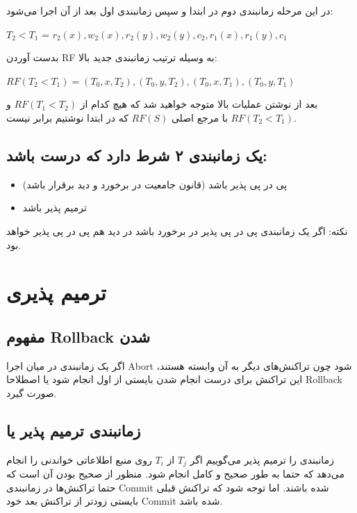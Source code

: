 \documentclass[a4paper]{article}
\begin{document}
در این مرحله زمانبندی دوم در ابتدا و سپس زمانبندی اول بعد از آن اجرا می‌شود:

\begin{LTR}
$T_{2} < T_{1}$ = $r_{2}(x), w_{2}(x), r_{2}(y), w_{2}(y), c_{2}, r_{1}(x), r_{1}(y), c_{1}$
\end{LTR}

بدست آوردن RF به وسیله ترتیب زمانبندی جدید بالا:

\begin{LTR}
$RF(T_{2} < T_{1}) = (T_{0}, x, T_{2}), (T_{0}, y, T_{2}), (T_{0}, x, T_{1}), (T_{0}, y, T_{1})$
\end{LTR}

بعد از نوشتن عملیات بالا متوجه خواهید شد که هیچ کدام از $RF(T_{1} < T_{2})$ و
$RF(T_{2} < T_{1})$ با مرجع اصلی $RF(S)$ که در ابتدا نوشتیم برابر نیست.

\subsection*{یک زمانبندی ۲ شرط دارد که درست باشد:}

\begin{itemize}
    \item پی در پی پذیر باشد (قانون جامعیت در برخورد و دید برقرار باشد)
    \item ترمیم پذیر باشد
\end{itemize}

نکته: اگر یک زمانبندی پی در پی پذیر در برخورد باشد در دید هم پی در پی پذیر خواهد بود.

\section{ترمیم پذیری}

\subsection{مفهوم Rollback شدن}

اگر یک زمانبندی در میان اجرا Abort شود چون تراکنش‌های دیگر به آن وابسته هستند،
این تراکنش برای درست انجام شدن بایستی از اول انجام شود یا اصطلاحا Rollback صورت
گیرد.

\subsection{زمانبندی ترمیم پذیر یا }

زمانبندی را ترمیم پذیر می‌گوییم اگر $T_j$ از $T_i$ روی منبع اطلاعاتی خواندنی را
انجام می‌دهد که حتما به طور صحیح و کامل انجام شود. منظور از صحیح بودن آن است که
حتما تراکنش‌ها در زمانبندی Commit شده باشند. اما توجه شود که تراکنش قبلی بایستی
زودتر از تراکنش بعد خود Commit شده باشد.
\end{document}
